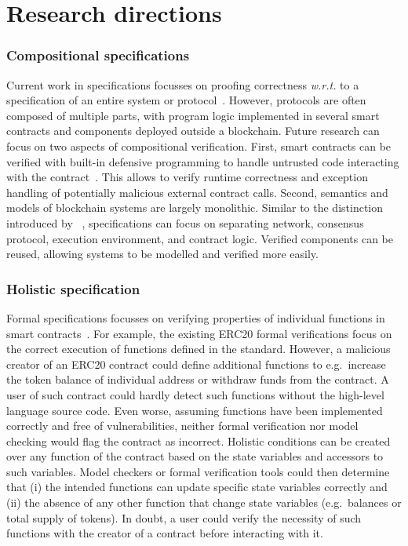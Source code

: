 \section{Research directions}
\label{discuss}

\subsubsection{Compositional specifications}
Current work in specifications focusses on proofing correctness \emph{w.r.t.} to a specification of an entire system or protocol~\cite{Palmskog2018,Pirlea2018}.
However, protocols are often composed of multiple parts, with program logic implemented in several smart contracts and components deployed outside a blockchain.
Future research can focus on two aspects of compositional verification.
First, smart contracts can be verified with built-in defensive programming to handle untrusted code interacting with the contract~\cite{Miller2018smart}.
This allows to verify runtime correctness and exception handling of potentially malicious external contract calls.
Second, semantics and models of blockchain systems are largely monolithic.
Similar to the distinction introduced by \citeauthor{Bonneau2015}~\cite{Bonneau2015}, specifications can focus on separating network, consensus protocol, execution environment, and contract logic.
Verified components can be reused, allowing systems to be modelled and verified more easily.

\subsubsection{Holistic specification}
Formal specifications focusses on verifying properties of individual functions in smart contracts~\cite{Hildenbrandt2017}.
For example, the existing ERC20 formal verifications focus on the correct execution of functions defined in the standard.
However, a malicious creator of an ERC20 contract could define additional functions to e.g.\ increase the token balance of individual address or withdraw funds from the contract.
A user of such contract could hardly detect such functions without the high-level language source code.
Even worse, assuming functions have been implemented correctly and free of vulnerabilities, neither formal verification nor model checking would flag the contract as incorrect.
Holistic conditions can be created over any function of the contract based on the state variables and accessors to such variables.
Model checkers or formal verification tools could then determine that (i) the intended functions can update specific state variables correctly and (ii) the absence of any other function that change state variables (e.g.\ balances or total supply of tokens).
In doubt, a user could verify the necessity of such functions with the creator of a contract before interacting with it.

